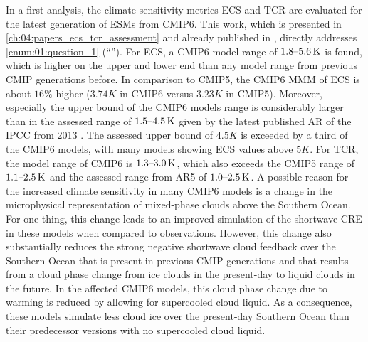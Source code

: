In a first analysis, the climate sensitivity metrics \ac{ECS} and \ac{TCR} are
evaluated for the latest generation of \acp{ESM} from \acs{CMIP}6. This work,
which is presented in \cref{ch:04:papers_ecs_tcr_assessment} and already
published in \textcite{Bock2020, Meehl2020}, directly addresses
\cref{enum:01:question_1} (\enquote{\emph{\KeyScienceQuestionOne{}}}). For
\ac{ECS}, a \acs{CMIP}6 model range of $\rangeunit{1.8}{5.6}{K}$ is found,
which is higher on the upper and lower end than any model range from previous
\ac{CMIP} generations before. In comparison to \acs{CMIP}5, the \acs{CMIP}6
\ac{MMM} of \ac{ECS} is about $16 \unit{\%}$ higher ($3.74 \unit{K}$ in
\acs{CMIP}6 versus $3.23 \unit{K}$ in \acs{CMIP}5). Moreover, especially the
upper bound of the \acs{CMIP}6 models range is considerably larger than in the
assessed range of $\rangeunit{1.5}{4.5}{K}$ given by the latest published
\ac{AR} of the \ac{IPCC} from 2013 \autocite{Stocker2013}. The assessed upper
bound of $4.5 \unit{K}$ is exceeded by a third of the \acs{CMIP}6 models, with
many models showing \ac{ECS} values above $5 \unit{K}$. For \ac{TCR}, the model
range of \acs{CMIP}6 is $\rangeunit{1.3}{3.0}{K}$, which also exceeds the
\acs{CMIP}5 range of $\rangeunit{1.1}{2.5}{K}$ and the assessed range from
\acs{AR}5 of $\rangeunit{1.0}{2.5}{K}$. A possible reason for the increased
climate sensitivity in many \acs{CMIP}6 models is a change in the microphysical
representation of mixed-phase clouds above the Southern Ocean. For one thing,
this change leads to an improved simulation of the shortwave \ac{CRE} in these
models when compared to observations. However, this change also substantially
reduces the strong negative shortwave cloud feedback over the Southern Ocean
that is present in previous \ac{CMIP} generations and that results from a cloud
phase change from ice clouds in the present-day to liquid clouds in the future.
In the affected \acs{CMIP}6 models, this cloud phase change due to warming is
reduced by allowing for supercooled cloud liquid. As a consequence, these
models simulate less cloud ice over the present-day Southern Ocean than their
predecessor versions with no supercooled cloud liquid.

